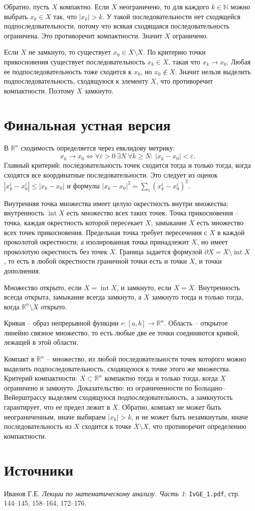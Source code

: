 \documentclass[12pt,a4paper]{article}
\newcommand{\R}{\mathbb{R}}
\newcommand{\eps}{\varepsilon}
\begin{document}
Обратно, пусть \(X\) компактно. Если \(X\) неограничено, то для каждого
\(k\in\mathbb N\) можно выбрать \(x_k\in X\) так, что \(|x_k|>k\). У такой
последовательности нет сходящейся подпоследовательности, потому что всякая
сходящаяся последовательность ограничена. Это противоречит компактности.
Значит \(X\) ограничено.

Если \(X\) не замкнуто, то существует \(x_0\in\overline X\setminus X\). По
критерию точки прикосновения существует последовательность \(x_k\in X\),
такая что \(x_k\to x_0\). Любая ее подпоследовательность тоже сходится к
\(x_0\), но \(x_0\notin X\). Значит нельзя выделить подпоследовательность,
сходящуюся к элементу \(X\), что противоречит компактности. Поэтому \(X\)
замкнуто.

\section*{Финальная устная версия}

В \(\R^n\) сходимость определяется через евклидову метрику:
\[
  x_k\to x_0 \Longleftrightarrow
  \forall\eps>0\ \exists N\ \forall k\ge N:\ |x_k-x_0|<\eps.
\]
Главный критерий: последовательность точек сходится тогда и только тогда,
когда сходятся все координатные последовательности. Это следует из оценок
\(|x_k^i-x_0^i|\le |x_k-x_0|\) и формулы
\(|x_k-x_0|^2=\sum_i(x_k^i-x_0^i)^2\).

Внутренняя точка множества имеет целую окрестность внутри множества;
внутренность \(\operatorname{int}X\) есть множество всех таких точек. Точка
прикосновения -- точка, каждая окрестность которой пересекает \(X\);
замыкание \(\overline X\) есть множество всех точек прикосновения.
Предельная точка требует пересечения с \(X\) в каждой проколотой
окрестности, а изолированная точка принадлежит \(X\), но имеет проколотую
окрестность без точек \(X\). Граница задается формулой
\(\partial X=\overline X\setminus\operatorname{int}X\), то есть в любой
окрестности граничной точки есть и точки \(X\), и точки дополнения.

Множество открыто, если \(X=\operatorname{int}X\), и замкнуто, если
\(X=\overline X\). Внутренность всегда открыта, замыкание всегда замкнуто,
а \(X\) замкнуто тогда и только тогда, когда \(\R^n\setminus X\) открыто.

Кривая -- образ непрерывной функции \(r:[a,b]\to\R^n\). Область -- открытое
линейно связное множество, то есть любые две ее точки соединяются кривой,
лежащей в этой области.

Компакт в \(\R^n\) -- множество, из любой последовательности точек которого
можно выделить подпоследовательность, сходящуюся к точке этого же множества.
Критерий компактности: \(X\subset\R^n\) компактно тогда и только тогда,
когда \(X\) ограничено и замкнуто. Доказательство: из ограниченности по
Больцано--Вейерштрассу выделяем сходящуюся подпоследовательность, а
замкнутость гарантирует, что ее предел лежит в \(X\). Обратно, компакт не
может быть неограниченным, иначе выбираем \(|x_k|>k\), и не может быть
незамкнутым, иначе последовательность из \(X\) сходится к точке
\(\overline X\setminus X\), что противоречит определению компактности.

\section*{Источники}

Иванов Г.Е. \emph{Лекции по математическому анализу. Часть 1}:
\texttt{IvGE\_1.pdf}, стр. 144--145, 158--164, 172--176.
\end{document}
